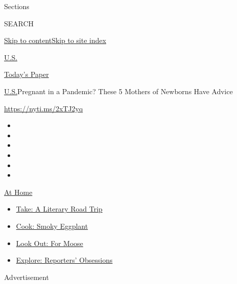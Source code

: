 Sections

SEARCH

\protect\hyperlink{site-content}{Skip to
content}\protect\hyperlink{site-index}{Skip to site index}

\href{https://www.nytimes.com/section/us}{U.S.}

\href{https://myaccount.nytimes.com/auth/login?response_type=cookie\&client_id=vi}{}

\href{https://www.nytimes.com/section/todayspaper}{Today's Paper}

\href{/section/us}{U.S.}\textbar{}Pregnant in a Pandemic? These 5
Mothers of Newborns Have Advice

\url{https://nyti.ms/2xTJ2yq}

\begin{itemize}
\item
\item
\item
\item
\item
\item
\end{itemize}

\href{https://www.nytimes.com/spotlight/at-home?action=click\&pgtype=Article\&state=default\&region=TOP_BANNER\&context=at_home_menu}{At
Home}

\begin{itemize}
\tightlist
\item
  \href{https://www.nytimes.com/2020/07/28/books/time-for-a-literary-road-trip.html?action=click\&pgtype=Article\&state=default\&region=TOP_BANNER\&context=at_home_menu}{Take:
  A Literary Road Trip}
\item
  \href{https://www.nytimes.com/2020/07/29/magazine/bored-with-your-home-cooking-some-smoky-eggplant-will-fix-that.html?action=click\&pgtype=Article\&state=default\&region=TOP_BANNER\&context=at_home_menu}{Cook:
  Smoky Eggplant}
\item
  \href{https://www.nytimes.com/2020/07/27/travel/moose-michigan-isle-royale.html?action=click\&pgtype=Article\&state=default\&region=TOP_BANNER\&context=at_home_menu}{Look
  Out: For Moose}
\item
  \href{https://www.nytimes.com/interactive/2020/at-home/even-more-reporters-editors-diaries-lists-recommendations.html?action=click\&pgtype=Article\&state=default\&region=TOP_BANNER\&context=at_home_menu}{Explore:
  Reporters' Obsessions}
\end{itemize}

Advertisement


